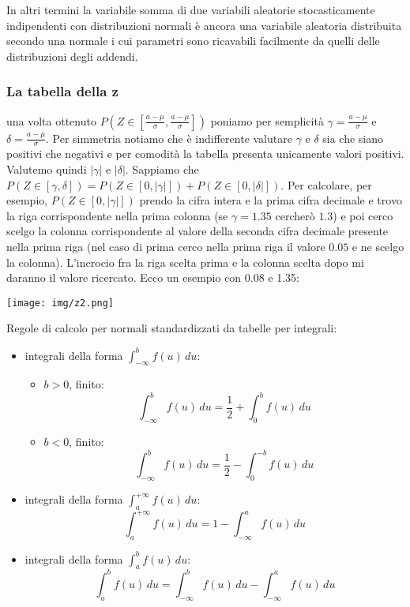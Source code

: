 \documentclass[a4paper,12pt, oneside]{book}
\begin{document}
In altri termini la variabile somma di due variabili aleatorie stocasticamente indipendenti con distribuzioni normali è ancora una variabile aleatoria distribuita
secondo una normale i cui parametri sono ricavabili facilmente da quelli delle distribuzioni degli addendi.\\
\begin{shaded}
\subsubsection{La tabella della z}
una volta ottenuto $P\left(Z\in\left[\frac{a-\mu}{\sigma},\frac{a-\mu}{\sigma}\right]\right)$ poniamo per semplicità $\gamma= \frac{a-\mu}{\sigma}$ e $\delta=\frac{a-\mu}{\sigma}$. Per simmetria notiamo che è indifferente valutare $\gamma$ e $\delta$ sia che siano positivi che negativi e per comodità la tabella presenta unicamente valori positivi. Valutemo quindi $|\gamma|$ e $|\delta|$. Sappiamo che $P(Z\in[\gamma,\delta])=P(Z\in[0, |\gamma|])+P(Z\in[0,|\delta|])$. Per calcolare, per esempio, $P(Z\in[0, |\gamma|])$ prendo la cifra intera e la prima cifra decimale e trovo la riga corrispondente nella prima colonna (se $\gamma=1.35$ cercherò $1.3$) e poi cerco scelgo la colonna corrispondente al valore della seconda cifra decimale presente nella prima riga (nel caso di prima cerco nella prima riga il valore $0.05$ e ne scelgo la colonna). L'incrocio fra la riga scelta prima e la colonna scelta dopo mi daranno il valore ricercato. Ecco un esempio con 0.08 e 1.35:
\begin{center}
	\texttt{[image: img/z2.png]}
\end{center}
\end{shaded}
\begin{shaded}
Regole di calcolo per normali standardizzati da tabelle per integrali:
\begin{itemize}
	\item integrali della forma $\int_{-\infty}^bf(u)\,du$:
	\begin{itemize}
		\item $b>0$, finito:
			\[\int_{-\infty}^b f(u)\, du= \frac{1}{2}+\int_0^b f(u)\, du\]
		\item $b<0$, finito:
			\[\int_{-\infty}^b f(u)\, du= \frac{1}{2}-\int_0^{-b} f(u)\, du\]
	\end{itemize}
	\item integrali della forma $\int_{a}^{+\infty}f(u)\,du$:
		\[\int_{a}^{+\infty}f(u)\,du= 1-\int_{-\infty}^{a} f(u)\, du\]
	\item integrali della forma $\int_{a}^{b}f(u)\,du$:
		\[\int_{a}^{b}f(u)\,du=\int_{-\infty}^bf(u)\,du-\int_{-\infty}^a f(u)\,du\]
\end{itemize}
\end{shaded}
\newpage
\end{document}
